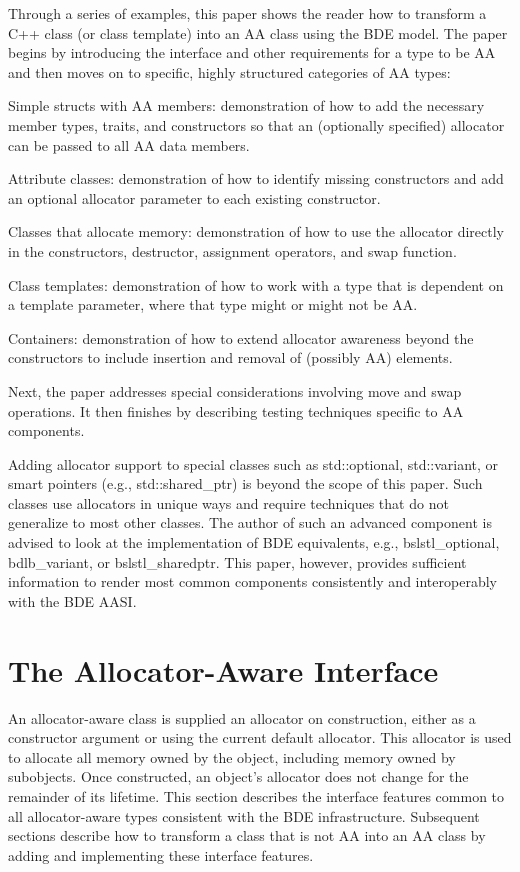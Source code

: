 Through a series of examples, this paper shows the reader how to transform
a C++ class (or class template) into an AA class using the BDE model. The
paper begins by introducing the interface and other requirements for a type
to be AA and then moves on to specific, highly structured categories of AA
types:
\begin{description}
\item{Simple structs with AA members}: demonstration of how to add the necessary
  member types, traits, and constructors so that an (optionally specified)
  allocator can be passed to all AA data members.
\item{Attribute classes}: demonstration of how to identify missing constructors
  and add an optional allocator parameter to each existing constructor.
\item{Classes that allocate memory}: demonstration of how to use the allocator
  directly in the constructors, destructor, assignment operators, and swap
  function.
\item{Class templates}: demonstration of how to work with a type that is
  dependent on a template parameter, where that type might or might not be AA.
\item{Containers}: demonstration of how to extend allocator awareness beyond
  the constructors to include insertion and removal of (possibly AA) elements.
\end{description}

Next, the paper addresses special considerations involving move and swap
operations. It then finishes by describing testing techniques specific to
AA components.

Adding allocator support to special classes such as std::optional,
std::variant, or smart pointers (e.g., std::shared_ptr) is beyond the scope of
this paper. Such classes use allocators in unique ways and require techniques
that do not generalize to most other classes. The author of such an advanced
component is advised to look at the implementation of BDE equivalents, e.g.,
bslstl_optional,  bdlb_variant, or bslstl_sharedptr. This paper, however,
provides sufficient information to render most common components consistently
and interoperably with the BDE AASI.

\section{The Allocator-Aware Interface}
An allocator-aware class is supplied an allocator on construction, either as a
constructor argument or using the current default allocator. This allocator is
used to allocate all memory owned by the object, including memory owned by
subobjects. Once constructed, an object’s allocator does not change for the
remainder of its lifetime.  This section describes the interface features
common to all allocator-aware types consistent with the BDE infrastructure.
Subsequent sections describe how to transform a class that is not AA into an
AA class by adding and implementing these interface features.

